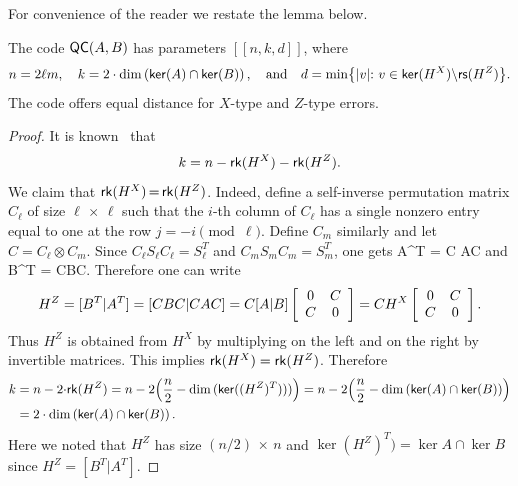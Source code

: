 \documentclass{article}
\begin{document}
For convenience of the reader we restate the lemma below.
\setcounter{lemma}{0}
\begin{lemma}
The code $\qc$ has parameters $[[n,k,d]]$, where
\[
n = 2\ell m,\quad 
k = 2\cdot\mathrm{dim}\left(\ker{A} \cap \ker{B}\right),
\quad \mbox{and} \quad
d= \min\bigl\{ |v|{:} \,\, v\in \ker{H^X}{\setminus} \rs{H^Z} \bigr\}.
\]
The code offers equal distance for $X$-type and $Z$-type errors.
\end{lemma}
\begin{proof}
It is known~\cite{steane1996multiple,calderbank1996good} that 
\[
k = n - \rk{H^X}-\rk{H^Z}.
\]
We claim that $\rk{H^X}\,{=}\,\rk{H^Z}$.
Indeed, define a self-inverse permutation matrix $C_\ell$ of size $\ell \,{\times}\, \ell$ such that the $i$-th column of $C_\ell$ has a single nonzero entry equal to one at the row $j=-i{\pmod \ell}$. Define $C_m$ similarly
and let $C=C_\ell \otimes C_m$. Since $C_\ell S_\ell C_\ell = S_\ell^T$
and $C_m S_m C_m = S_m^T$, one gets
\be
\label{ABC2}
A^T = C AC \quad \mbox{and} \quad B^T = CBC.
\ee
Therefore one can write
\[
H^Z= [B^T|A^T] = [CBC |CAC] = C[A|B]\left[ \ba{cc} 0 & C  \\ C & 0\\ \ea \right]
=CH^X\left[ \ba{cc} 0 & C  \\ C & 0\\ \ea \right].
\]
Thus $H^Z$ is obtained from $H^X$ by multiplying on the left and on the right by invertible matrices.
This implies $\rk{H^X}=\rk{H^Z}$. Therefore
\begin{align*}
k& = n-2{\cdot}\rk{H^Z}=n-2{\left(\frac{n}2-\dim{(\ker{(H^Z)^T)})}\right)} = n - 2{\left(\frac{n}2-\dim{(\ker{A}\cap \ker{B})}\right)}\\
&= 2\cdot\mathrm{dim}\left(\ker{A} \cap \ker{B}\right).
\end{align*}
Here we noted that $H^Z$ has size $(n/2)\,{\times}\, n$ and $\ker{(H^Z)^T)}=\ker{A}\cap \ker{B}$ since $H^Z=[B^T|A^T]$.


\end{proof}
\end{document}
